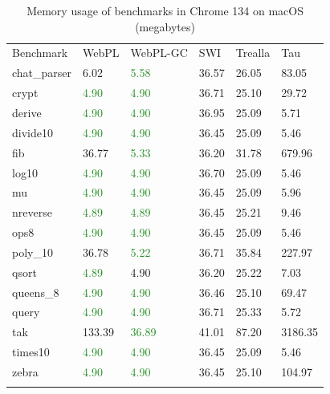 \begin{table}[H]
\centering
{}
\begin{tabular}{llllll}
\addlinespace\hline\addlinespace
Benchmark & WebPL & WebPL-GC & SWI & Trealla & Tau \\
\addlinespace\hline\addlinespace
chat\_parser & 6.02 & \textcolor{ForestGreen}{5.58} & 36.57 & 26.05 & 83.05 \\
crypt & \textcolor{ForestGreen}{4.90} & \textcolor{ForestGreen}{4.90} & 36.71 & 25.10 & 29.72 \\
derive & \textcolor{ForestGreen}{4.90} & \textcolor{ForestGreen}{4.90} & 36.95 & 25.09 & 5.71 \\
divide10 & \textcolor{ForestGreen}{4.90} & \textcolor{ForestGreen}{4.90} & 36.45 & 25.09 & 5.46 \\
fib & 36.77 & \textcolor{ForestGreen}{5.33} & 36.20 & 31.78 & 679.96 \\
log10 & \textcolor{ForestGreen}{4.90} & \textcolor{ForestGreen}{4.90} & 36.70 & 25.09 & 5.46 \\
mu & \textcolor{ForestGreen}{4.90} & \textcolor{ForestGreen}{4.90} & 36.45 & 25.09 & 5.96 \\
nreverse & \textcolor{ForestGreen}{4.89} & \textcolor{ForestGreen}{4.89} & 36.45 & 25.21 & 9.46 \\
ops8 & \textcolor{ForestGreen}{4.90} & \textcolor{ForestGreen}{4.90} & 36.45 & 25.09 & 5.46 \\
poly\_10 & 36.78 & \textcolor{ForestGreen}{5.22} & 36.71 & 35.84 & 227.97 \\
qsort & \textcolor{ForestGreen}{4.89} & 4.90 & 36.20 & 25.22 & 7.03 \\
queens\_8 & \textcolor{ForestGreen}{4.90} & \textcolor{ForestGreen}{4.90} & 36.46 & 25.10 & 69.47 \\
query & \textcolor{ForestGreen}{4.90} & \textcolor{ForestGreen}{4.90} & 36.71 & 25.33 & 5.72 \\
tak & 133.39 & \textcolor{ForestGreen}{36.89} & 41.01 & 87.20 & 3186.35 \\
times10 & \textcolor{ForestGreen}{4.90} & \textcolor{ForestGreen}{4.90} & 36.45 & 25.09 & 5.46 \\
zebra & \textcolor{ForestGreen}{4.90} & \textcolor{ForestGreen}{4.90} & 36.45 & 25.10 & 104.97 \\
\addlinespace\hline\addlinespace
\end{tabular}
\caption{Memory usage of benchmarks in Chrome 134 on macOS (megabytes)}
\label{tab:chrome-memory}
\end{table}

